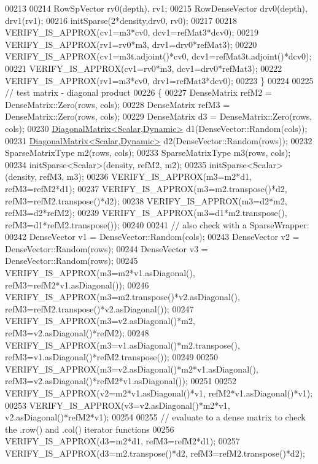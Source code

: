 \begin{DoxyCode}
00213     
00214     RowSpVector rv0(depth), rv1;
00215     RowDenseVector drv0(depth), drv1(rv1);
00216     initSparse(2*density,drv0, rv0);
00217 
00218     VERIFY\_IS\_APPROX(cv1=m3*cv0, dcv1=refMat3*dcv0);    
00219     VERIFY\_IS\_APPROX(rv1=rv0*m3, drv1=drv0*refMat3);
00220     VERIFY\_IS\_APPROX(cv1=m3t.adjoint()*cv0, dcv1=refMat3t.adjoint()*dcv0);
00221     VERIFY\_IS\_APPROX(cv1=rv0*m3, dcv1=drv0*refMat3);
00222     VERIFY\_IS\_APPROX(rv1=m3*cv0, drv1=refMat3*dcv0);
00223   \}
00224   
00225   \textcolor{comment}{// test matrix - diagonal product}
00226   \{
00227     DenseMatrix refM2 = DenseMatrix::Zero(rows, cols);
00228     DenseMatrix refM3 = DenseMatrix::Zero(rows, cols);
00229     DenseMatrix d3 = DenseMatrix::Zero(rows, cols);
00230     \hyperlink{group___core___module_class_eigen_1_1_diagonal_matrix}{DiagonalMatrix<Scalar,Dynamic>} d1(DenseVector::Random(cols));
00231     \hyperlink{group___core___module_class_eigen_1_1_diagonal_matrix}{DiagonalMatrix<Scalar,Dynamic>} d2(DenseVector::Random(rows));
00232     SparseMatrixType m2(rows, cols);
00233     SparseMatrixType m3(rows, cols);
00234     initSparse<Scalar>(density, refM2, m2);
00235     initSparse<Scalar>(density, refM3, m3);
00236     VERIFY\_IS\_APPROX(m3=m2*d1, refM3=refM2*d1);
00237     VERIFY\_IS\_APPROX(m3=m2.transpose()*d2, refM3=refM2.transpose()*d2);
00238     VERIFY\_IS\_APPROX(m3=d2*m2, refM3=d2*refM2);
00239     VERIFY\_IS\_APPROX(m3=d1*m2.transpose(), refM3=d1*refM2.transpose());
00240     
00241     \textcolor{comment}{// also check with a SparseWrapper:}
00242     DenseVector v1 = DenseVector::Random(cols);
00243     DenseVector v2 = DenseVector::Random(rows);
00244     DenseVector v3 = DenseVector::Random(rows);
00245     VERIFY\_IS\_APPROX(m3=m2*v1.asDiagonal(), refM3=refM2*v1.asDiagonal());
00246     VERIFY\_IS\_APPROX(m3=m2.transpose()*v2.asDiagonal(), refM3=refM2.transpose()*v2.asDiagonal());
00247     VERIFY\_IS\_APPROX(m3=v2.asDiagonal()*m2, refM3=v2.asDiagonal()*refM2);
00248     VERIFY\_IS\_APPROX(m3=v1.asDiagonal()*m2.transpose(), refM3=v1.asDiagonal()*refM2.transpose());
00249     
00250     VERIFY\_IS\_APPROX(m3=v2.asDiagonal()*m2*v1.asDiagonal(), refM3=v2.asDiagonal()*refM2*v1.asDiagonal());
00251 
00252     VERIFY\_IS\_APPROX(v2=m2*v1.asDiagonal()*v1, refM2*v1.asDiagonal()*v1);
00253     VERIFY\_IS\_APPROX(v3=v2.asDiagonal()*m2*v1, v2.asDiagonal()*refM2*v1);
00254     
00255     \textcolor{comment}{// evaluate to a dense matrix to check the .row() and .col() iterator functions}
00256     VERIFY\_IS\_APPROX(d3=m2*d1, refM3=refM2*d1);
00257     VERIFY\_IS\_APPROX(d3=m2.transpose()*d2, refM3=refM2.transpose()*d2);

\end{DoxyCode}
